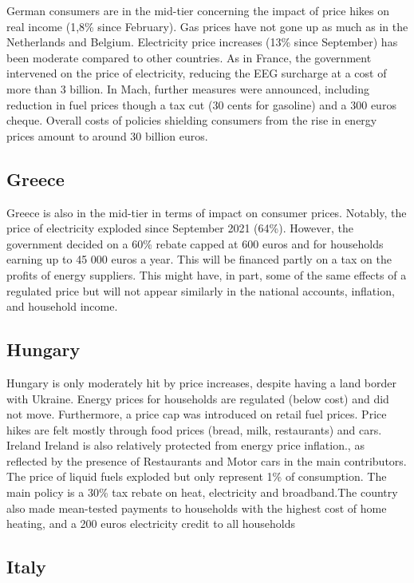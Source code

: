 \documentclass[
  9pt,
  a4paper,
  numbers=noendperiod,
  DIV=12]{scrartcl}
\begin{document}
German consumers are in the mid-tier concerning the impact of price
hikes on real income (1,8\% since February). Gas prices have not gone up
as much as in the Netherlands and Belgium. Electricity price increases
(13\% since September) has been moderate compared to other countries. As
in France, the government intervened on the price of electricity,
reducing the EEG surcharge at a cost of more than 3 billion. In Mach,
further measures were announced, including reduction in fuel prices
though a tax cut (30 cents for gasoline) and a 300 euros cheque. Overall
costs of policies shielding consumers from the rise in energy prices
amount to around 30 billion euros.

\hypertarget{greece}{%
\subsection{Greece}\label{greece}}

Greece is also in the mid-tier in terms of impact on consumer prices.
Notably, the price of electricity exploded since September 2021 (64\%).
However, the government decided on a 60\% rebate capped at 600 euros and
for households earning up to 45 000 euros a year. This will be financed
partly on a tax on the profits of energy suppliers. This might have, in
part, some of the same effects of a regulated price but will not appear
similarly in the national accounts, inflation, and household income.

\hypertarget{hungary}{%
\subsection{Hungary}\label{hungary}}

Hungary is only moderately hit by price increases, despite having a land
border with Ukraine. Energy prices for households are regulated (below
cost) and did not move. Furthermore, a price cap was introduced on
retail fuel prices. Price hikes are felt mostly through food prices
(bread, milk, restaurants) and cars. Ireland Ireland is also relatively
protected from energy price inflation., as reflected by the presence of
Restaurants and Motor cars in the main contributors. The price of liquid
fuels exploded but only represent 1\% of consumption. The main policy is
a 30\% tax rebate on heat, electricity and broadband.The country also
made mean-tested payments to households with the highest cost of home
heating, and a 200 euros electricity credit to all households

\hypertarget{italy}{%
\subsection{Italy}\label{italy}}
\end{document}
